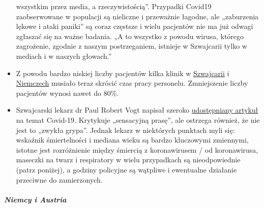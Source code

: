 \begin{itemize}
  wszystkim przez media, a rzeczywistością''. Przypadki Covid19
  zaobserwowane w populacji są nieliczne i przeważnie łagodne, ale
  „zaburzenia lękowe i ataki paniki'' są coraz częstsze i wielu
  pacjentów nie ma już odwagi zgłaszać się na ważne badania. „A to
  wszystko z powodu wirusa, którego zagrożenie, zgodnie z naszym
  postrzeganiem, istnieje w Szwajcarii tylko w mediach i w naszych
  głowach.''
\item
  Z powodu bardzo niskiej liczby pacjentów kilka klinik w
  \href{https://www.20min.ch/schweiz/news/story/Spitaeler-28949526}{Szwajcarii}
  i
  \href{https://www.spiegel.de/wirtschaft/unternehmen/trotz-corona-pandemie-warum-kliniken-jetzt-kurzarbeit-anmelden-a-3dc61bc9-fb12-4298-8022-bb4c2be39d7d}{Niemczech}
  musiało teraz skrócić czas pracy personelu. Zmniejszenie liczby
  pacjentów wynosi nawet do 80\%.
\item
  Szwajcarski lekarz dr Paul Robert Vogt napisał szeroko
  \href{https://www.mittellaendische.ch/2020/04/07/covid-19-eine-zwischenbilanz-oder-eine-analyse-der-moral-der-medizinischen-fakten-sowie-der-aktuellen-und-zuk\%C3\%BCnftigen-politischen-entscheidungen/}{udostępniany
  artykuł} na temat Covid-19. Krytykuje „sensacyjną prasę'', ale
  ostrzega również, że nie jest to „zwykła grypa''. Jednak lekarz w
  niektórych punktach myli się: wskaźnik śmiertelności i mediana wieku
  są bardzo kluczowymi zmiennymi, istotne jest rozróżnienie między
  śmiercią z koronawirusem / od koronawirusa, maseczki na twarz i
  respiratory w wielu przypadkach są nieodpowiednie (patrz poniżej), a
  godziny policyjne są wątpliwe i ewentualne działanie przeciwne do
  zamierzonych.
\end{itemize}

\hypertarget{niemcy-i-austria-1}{%
\subparagraph{\texorpdfstring{\textbf{Niemcy i
Austria}}{Niemcy i Austria}}\label{niemcy-i-austria-1}}

